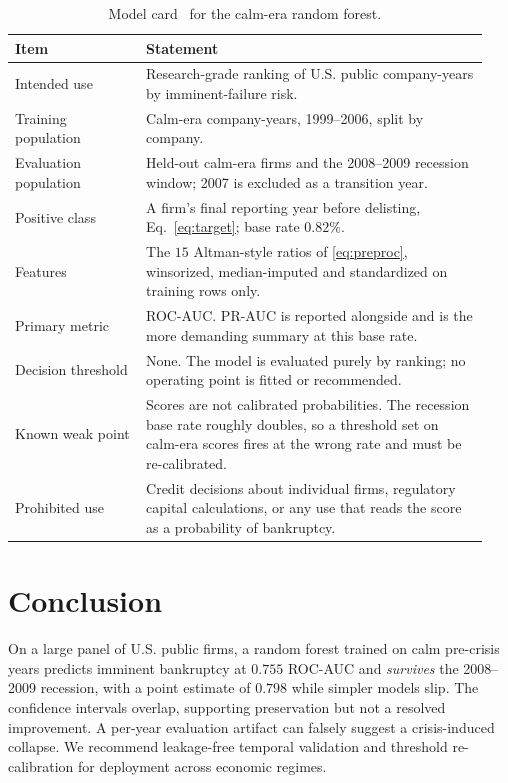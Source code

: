 \documentclass[manuscript,nonacm]{acmart}
\begin{document}
\begin{table}[H]
\centering
\caption{Model card~\cite{mitchell2019modelcards} for the calm-era random forest.}
\label{tab:card}
\begin{tabular}{@{}p{0.26\linewidth}p{0.68\linewidth}@{}}
\toprule
Item & Statement\\
\midrule
Intended use & Research-grade ranking of U.S. public company-years by imminent-failure risk.\\
Training population & Calm-era company-years, 1999--2006, split by company.\\
Evaluation population & Held-out calm-era firms and the 2008--2009 recession window; 2007 is excluded as a transition year.\\
Positive class & A firm's final reporting year before delisting, Eq.~\eqref{eq:target}; base rate $0.82\%$.\\
Features & The $15$ Altman-style ratios of \cref{eq:preproc}, winsorized, median-imputed and standardized on training rows only.\\
Primary metric & ROC-AUC. PR-AUC is reported alongside and is the more demanding summary at this base rate.\\
Decision threshold & None. The model is evaluated purely by ranking; no operating point is fitted or recommended.\\
Known weak point & Scores are not calibrated probabilities. The recession base rate roughly doubles, so a threshold set on calm-era scores fires at the wrong rate and must be re-calibrated.\\
Prohibited use & Credit decisions about individual firms, regulatory capital calculations, or any use that reads the score as a probability of bankruptcy.\\
\bottomrule
\end{tabular}
\end{table}

\section{Conclusion}
On a large panel of U.S. public firms, a random forest trained on calm pre-crisis years
predicts imminent bankruptcy at $0.755$ ROC-AUC and \emph{survives} the 2008--2009
recession, with a point estimate of $0.798$ while simpler models slip. The confidence
intervals overlap, supporting preservation but not a resolved improvement. A per-year
evaluation artifact can falsely suggest a
crisis-induced collapse. We recommend leakage-free temporal validation and threshold
re-calibration for deployment across economic regimes.
\end{document}
